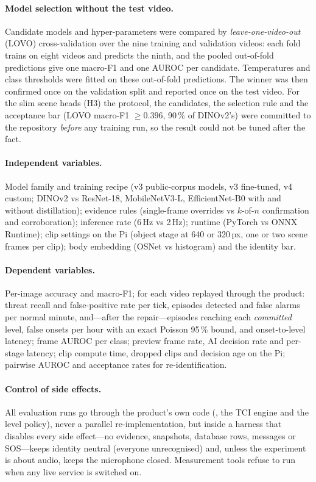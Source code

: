 \paragraph{Model selection without the test video.} Candidate models and hyper-parameters were compared by \emph{leave-one-video-out} (LOVO) cross-validation over the nine training and validation videos: each fold trains on eight videos and predicts the ninth, and the pooled out-of-fold predictions give one macro-F1 and one AUROC per candidate. Temperatures and class thresholds were fitted on these out-of-fold predictions. The winner was then confirmed once on the validation split and reported once on the test video. For the slim scene heads (H3) the protocol, the candidates, the selection rule and the acceptance bar (LOVO macro-F1 $\geq 0.396$, 90\,\% of DINOv2's) were committed to the repository \emph{before} any training run, so the result could not be tuned after the fact.

\paragraph{Independent variables.} Model family and training recipe (v3 public-corpus models, v3 fine-tuned, v4 custom; DINOv2 vs ResNet-18, MobileNetV3-L, EfficientNet-B0 with and without distillation); evidence rules (single-frame overrides vs $k$-of-$n$ confirmation and corroboration); inference rate (6\,Hz vs 2\,Hz); runtime (PyTorch vs ONNX Runtime); clip settings on the Pi (object stage at 640 or 320\,px, one or two scene frames per clip); body embedding (OSNet vs histogram) and the identity bar.

\paragraph{Dependent variables.} Per-image accuracy and macro-F1; for each video replayed through the product: threat recall and false-positive rate per tick, episodes detected and false alarms per normal minute, and---after the repair---episodes reaching each \emph{committed} level, false onsets per hour with an exact Poisson 95\,\% bound, and onset-to-level latency; frame AUROC per class; preview frame rate, AI decision rate and per-stage latency; clip compute time, dropped clips and decision age on the Pi; pairwise AUROC and acceptance rates for re-identification.

\paragraph{Control of side effects.} All evaluation runs go through the product's own code (, the TCI engine and the level policy), never a parallel re-implementation, but inside a harness that disables every side effect---no evidence, snapshots, database rows, messages or SOS---keeps identity neutral (everyone unrecognised) and, unless the experiment is about audio, keeps the microphone closed. Measurement tools refuse to run when any live service is switched on.

